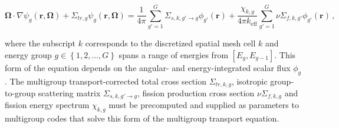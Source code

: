 \begin{equation}
\label{eqn:transport-mg}
\mathbf{\Omega} \cdot \nabla \psi_{g}(\mathbf{r},\mathbf{\Omega}) + \Sigma_{tr,g}\psi_{g}(\mathbf{r},\mathbf{\Omega}) = \frac{1}{4\pi} \sum_{g'=1}^{G} \Sigma_{s,k,g' \rightarrow g}\phi_{g'}(\mathbf{r}) + \frac{\chi_{k,g}}{4\pi k_{\textrm{eff}}}\sum_{g'=1}^{G} \nu\Sigma_{f,k,g'}\phi_{g'}(\mathbf{r})\,,
\end{equation}

\noindent where the subscript $k$ corresponds to the discretized spatial mesh cell $k$ and energy group $g \in \left\{1, 2, \ldots, G\right\}$ spans a range of energies from $\left[E_{g}, E_{g-1}\right]$. This form of the equation depends on the angular- and energy-integrated scalar flux $\phi_g$. The multigroup transport-corrected total cross section $\Sigma_{tr,k,g}$, isotropic group-to-group scattering matrix $\Sigma_{s,k,g'\rightarrow g}$, fission production cross section $\nu\Sigma_{f,k,g}$ and fission energy spectrum $\chi_{k,g}$ must be precomputed and supplied as parameters to multigroup codes that solve this form of the multigroup transport equation.

